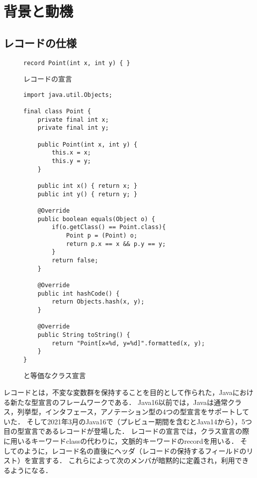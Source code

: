 \section{背景と動機\label{motivation}}

\subsection{レコードの仕様\label{record_specification}}

\begin{figure}[t]
\begin{lstlisting}
record Point(int x, int y) { }
\end{lstlisting}
\caption{レコードの宣言}
\label{record_decl}
\end{figure}

\begin{figure}[t]
\begin{lstlisting}
import java.util.Objects;

final class Point {
    private final int x;
    private final int y;

    public Point(int x, int y) {
        this.x = x;
        this.y = y;
    }

    public int x() { return x; }
    public int y() { return y; }

    @Override
    public boolean equals(Object o) {
        if(o.getClass() == Point.class){
            Point p = (Point) o;
            return p.x == x && p.y == y;
        }
        return false;
    }

    @Override
    public int hashCode() {
        return Objects.hash(x, y);
    }

    @Override
    public String toString() {
        return "Point[x=%d, y=%d]".formatted(x, y);
    }
}
\end{lstlisting}
\caption{と等価なクラス宣言}
\label{class_decl}
\end{figure}

レコードとは，不変な変数群を保持することを目的として作られた，Javaにおける新たな型宣言のフレームワークである\cite{Record_Purpose}．
Java16以前では，Javaは通常クラス，列挙型，インタフェース，アノテーション型の4つの型宣言をサポートしていた．
そして2021年3月のJava16で（プレビュー期間を含むとJava14から），5つ目の型宣言であるレコードが登場した．
レコードの宣言では，クラス宣言の際に用いるキーワードclassの代わりに，文脈的キーワードのrecordを用いる．
そしてのように，レコード名の直後にヘッダ（レコードの保持するフィールドのリスト）を宣言する．
これらによって次のメンバが暗黙的に定義され，利用できるようになる．

